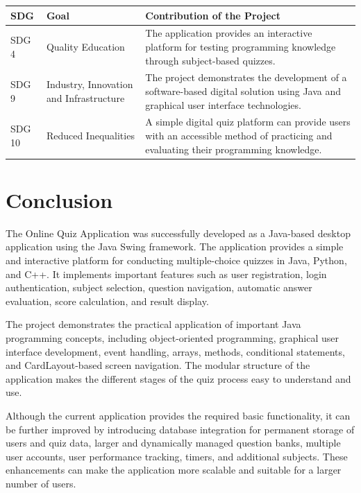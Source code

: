 \documentclass[11pt,a4paper]{report}  %
\begin{document}
\begin{longtable}{|p{2cm}|p{5cm}|p{7cm}|}
\hline
\textbf{SDG} & \textbf{Goal} & \textbf{Contribution of the Project} \\
\hline

SDG 4 & Quality Education & The application provides an interactive platform for testing programming knowledge through subject-based quizzes. \\
\hline

SDG 9 & Industry, Innovation and Infrastructure & The project demonstrates the development of a software-based digital solution using Java and graphical user interface technologies. \\
\hline

SDG 10 & Reduced Inequalities & A simple digital quiz platform can provide users with an accessible method of practicing and evaluating their programming knowledge. \\
\hline

\end{longtable}
\section{Conclusion}

The Online Quiz Application was successfully developed as a Java-based desktop application using the Java Swing framework. The application provides a simple and interactive platform for conducting multiple-choice quizzes in Java, Python, and C++. It implements important features such as user registration, login authentication, subject selection, question navigation, automatic answer evaluation, score calculation, and result display.

The project demonstrates the practical application of important Java programming concepts, including object-oriented programming, graphical user interface development, event handling, arrays, methods, conditional statements, and CardLayout-based screen navigation. The modular structure of the application makes the different stages of the quiz process easy to understand and use.

Although the current application provides the required basic functionality, it can be further improved by introducing database integration for permanent storage of users and quiz data, larger and dynamically managed question banks, multiple user accounts, user performance tracking, timers, and additional subjects. These enhancements can make the application more scalable and suitable for a larger number of users.
\end{document}
